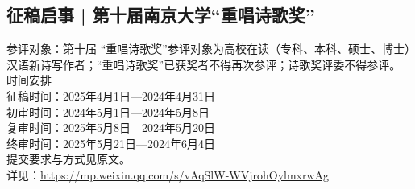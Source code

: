 \documentclass[letterpaper, 12pt]{article}
\begin{document}
\begin{multicols}{2}
\subsection{征稿启事 | 第十届南京大学“重唱诗歌奖”}
参评对象：第十届 “重唱诗歌奖”参评对象为高校在读（专科、本科、硕士、博士）汉语新诗写作者；“重唱诗歌奖”已获奖者不得再次参评；诗歌奖评委不得参评。
\\时间安排
\\征稿时间：2025年4月1日—2024年4月31日
\\初审时间：2024年5月1日—2024年5月8日
\\复审时间：2025年5月8日—2024年5月20日
\\终审时间：2025年5月21日—2024年6月4日
\\提交要求与方式见原文。
\\详见：\url{https://mp.weixin.qq.com/s/vAqSlW-WVjrohOylmxrwAg}
\end{multicols}
\end{document}
